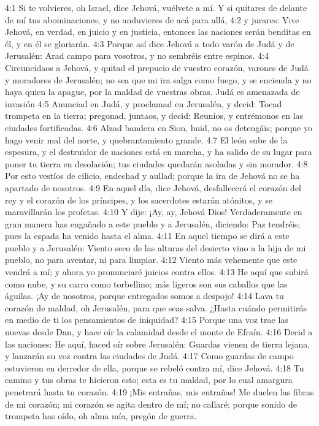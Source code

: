4:1 Si te volvieres, oh Israel, dice Jehová, vuélvete a mí. Y si quitares de delante de mí tus abominaciones, y no anduvieres de acá para allá, 
4:2 y jurares: Vive Jehová, en verdad, en juicio y en justicia, entonces las naciones serán benditas en él, y en él se gloriarán. 
4:3 Porque así dice Jehová a todo varón de Judá y de Jerusalén: Arad campo para vosotros, y no sembréis entre espinos. 
4:4 Circuncidaos a Jehová, y quitad el prepucio de vuestro corazón, varones de Judá y moradores de Jerusalén; no sea que mi ira salga como fuego, y se encienda y no haya quien la apague, por la maldad de vuestras obras. 
Judá es amenazada de invasión 
4:5 Anunciad en Judá, y proclamad en Jerusalén, y decid: Tocad trompeta en la tierra; pregonad, juntaos, y decid: Reuníos, y entrémonos en las ciudades fortificadas. 
4:6 Alzad bandera en Sion, huid, no os detengáis; porque yo hago venir mal del norte, y quebrantamiento grande. 
4:7 El león sube de la espesura, y el destruidor de naciones está en marcha, y ha salido de su lugar para poner tu tierra en desolación; tus ciudades quedarán asoladas y sin morador. 
4:8 Por esto vestíos de cilicio, endechad y aullad; porque la ira de Jehová no se ha apartado de nosotros. 
4:9 En aquel día, dice Jehová, desfallecerá el corazón del rey y el corazón de los príncipes, y los sacerdotes estarán atónitos, y se maravillarán los profetas. 
4:10 Y dije: ¡Ay, ay, Jehová Dios! Verdaderamente en gran manera has engañado a este pueblo y a Jerusalén, diciendo: Paz tendréis; pues la espada ha venido hasta el alma. 
4:11 En aquel tiempo se dirá a este pueblo y a Jerusalén: Viento seco de las alturas del desierto vino a la hija de mi pueblo, no para aventar, ni para limpiar. 
4:12 Viento más vehemente que este vendrá a mí; y ahora yo pronunciaré juicios contra ellos. 
4:13 He aquí que subirá como nube, y su carro como torbellino; más ligeros son sus caballos que las águilas. ¡Ay de nosotros, porque entregados somos a despojo! 
4:14 Lava tu corazón de maldad, oh Jerusalén, para que seas salva. ¿Hasta cuándo permitirás en medio de ti los pensamientos de iniquidad? 
4:15 Porque una voz trae las nuevas desde Dan, y hace oír la calamidad desde el monte de Efraín. 
4:16 Decid a las naciones: He aquí, haced oír sobre Jerusalén: Guardas vienen de tierra lejana, y lanzarán su voz contra las ciudades de Judá. 
4:17 Como guardas de campo estuvieron en derredor de ella, porque se rebeló contra mí, dice Jehová. 
4:18 Tu camino y tus obras te hicieron esto; esta es tu maldad, por lo cual amargura penetrará hasta tu corazón. 
4:19 ¡Mis entrañas, mis entrañas! Me duelen las fibras de mi corazón; mi corazón se agita dentro de mí; no callaré; porque sonido de trompeta has oído, oh alma mía, pregón de guerra. 
